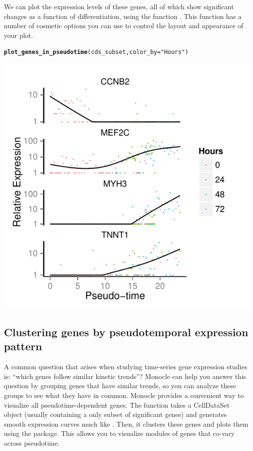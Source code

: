\documentclass[10pt,oneside]{article}\usepackage[]{graphicx}\usepackage[]{color}
\makeatletter
\def\maxwidth{ %
  \ifdim\Gin@nat@width>\linewidth
    \linewidth
  \else
    \Gin@nat@width
  \fi
}
\newcommand{\hlstr}[1]{\textcolor[rgb]{0.192,0.494,0.8}{#1}}%
\newcommand{\hlstd}[1]{\textcolor[rgb]{0.345,0.345,0.345}{#1}}%
\newcommand{\hlkwc}[1]{\textcolor[rgb]{0.333,0.667,0.333}{#1}}%
\newcommand{\hlkwd}[1]{\textcolor[rgb]{0.737,0.353,0.396}{\textbf{#1}}}%
\newenvironment{kframe}{%
 \def\at@end@of@kframe{}%
 \ifinner\ifhmode%
  \def\at@end@of@kframe{\end{minipage}}%
  \begin{minipage}{\columnwidth}%
 \fi\fi%
 \def\FrameCommand##1{\hskip\@totalleftmargin \hskip-\fboxsep
 \colorbox{shadecolor}{##1}\hskip-\fboxsep
     \hskip-\linewidth \hskip-\@totalleftmargin \hskip\columnwidth}%
 \MakeFramed {\advance\hsize-\width
   \@totalleftmargin\z@ \linewidth\hsize
   \@setminipage}}%
 {\par\unskip\endMakeFramed%
 \at@end@of@kframe}
\newenvironment{knitrout}{}{} %
\makeatother
\begin{document}
We can plot the expression levels of these genes, all of which show significant changes as a function of differentiation, using the function . This function has a number of cosmetic options you can use to control the layout and appearance of your plot.

\begin{knitrout}
\color{fgcolor}\begin{kframe}
\begin{alltt}
\hlkwd{plot_genes_in_pseudotime}\hlstd{(cds_subset,} \hlkwc{color_by}\hlstd{=}\hlstr{"Hours"}\hlstd{)}
\end{alltt}
\end{kframe}

{\centering \includegraphics[width=\maxwidth]{figure/plot_diff_res_pt-1} 

}



\end{knitrout}

\subsection{Clustering genes by pseudotemporal expression pattern}

A common question that arises when studying time-series gene expression studies is: ``which genes follow similar kinetic trends''?  Monocle can help you answer this question by grouping genes that have similar trends, so you can analyze these groups to see what they have in common.  Monocle provides a convenient way to visualize all pseudotime-dependent genes. The function
 takes a CellDataSet object (usually containing a only subset of significant genes)
and generates smooth expression curves much like  . Then, it clusters these genes 
and plots them using the  package.  This allows you to visualize modules of genes that
co-vary across pseudotime.
\end{document}
